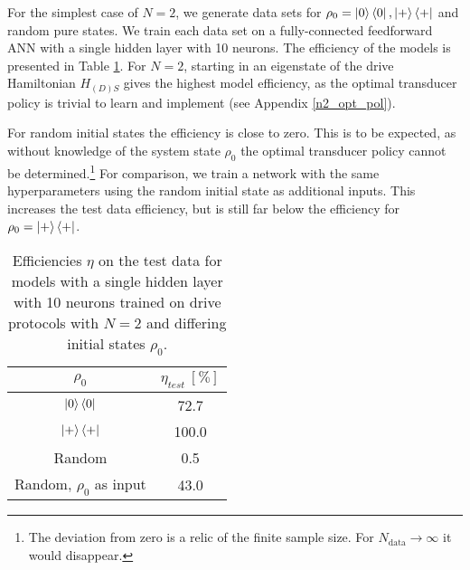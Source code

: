 For the simplest case of $N = 2$, we generate data sets for $\rho_0 = \ket{0} \bra{0}, \ket{+} \bra{+}$ and random pure states.
We train each data set on a fully-connected feedforward ANN with a single hidden layer with 10 neurons.
The efficiency of the models is presented in Table \ref{n2efftable}.
For $N = 2$, starting in an eigenstate of the drive Hamiltonian $H_{(D)S}$ gives the highest model efficiency, as the optimal transducer policy is trivial to learn and implement (see Appendix \ref{n2_opt_pol}).

For random initial states the efficiency is close to zero.
This is to be expected, as without knowledge of the system state $\rho_0$ the optimal transducer policy cannot be determined.\footnote{The deviation from zero is a relic of the finite sample size. For $N_{\mathrm{data}} \to \infty$ it would disappear.}
For comparison, we train a network with the same hyperparameters using the random initial state as additional inputs.
This increases the test data efficiency, but is still far below the efficiency for $\rho_0 = \ket{+} \bra{+}$.


\begin{table}[h]
	\centering
	\begin{tabular}{ c | c }
		$\rho_0$ & $\eta_{test} \ [\%]$ \\
		\hline
		$\ket{0} \bra{0}$ & 72.7 \\
		$\ket{+} \bra{+}$ & 100.0 \\
		Random & 0.5 \\
		Random, $\rho_0$ as input & 43.0 \\
	\end{tabular}
	\caption{Efficiencies $\eta$ on the test data for models with a single hidden layer with 10 neurons trained on drive protocols with $N = 2$ and differing initial states $\rho_0$.}
	\label{n2efftable}
\end{table}